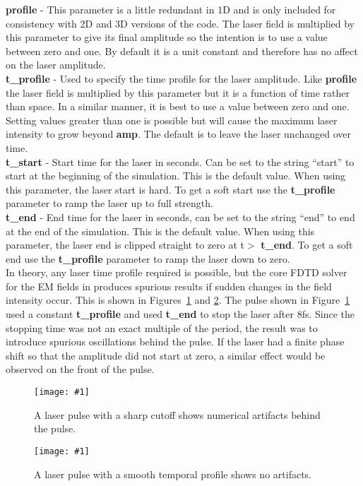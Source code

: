 \documentclass[12pt,a4paper]{article}
\newcommand{\emphtext}{\color{warwickdark} \fontfamily{phv}\selectfont\large\bf}
\newcommand{\inlineemph}[1]{{\color{warwicklight} \bf{#1}}}
\newcommand{\EPOCH}{{\color{warwickdark}\fontfamily{phv}\selectfont{EPOCH}}}
\newcommand{\captionedimage}[3]
  {{\begin{figure}[hbt!]\centering\texttt{[image: \#1]}\caption{#3}\label{#2}
    \end{figure}}}
\begin{document}
{\emphtext profile} - This parameter is a little redundant in 1D and is
only included for consistency with 2D and 3D versions of the code.
The laser field is multiplied by this parameter to give its final amplitude
so the intention is to use a value between zero and one. By default it is a
unit constant and therefore has no affect on the laser amplitude.\\

{\emphtext t\_profile} - Used to specify the time profile for the laser
amplitude. Like \inlineemph{profile} the laser field is multiplied by
this parameter but it is a function of time rather than space. In a similar
manner, it is best to use a value between zero and one.
Setting values greater than one is possible but will cause the maximum laser
intensity to grow beyond \inlineemph{amp}. The default is to leave the
laser unchanged over time.\\

{\emphtext t\_start} - Start time for the laser in seconds. Can be set to the
string ``start'' to start at the beginning of the simulation. This is the
default value. When using this parameter, the laser start is hard. To get a
soft start use the \inlineemph{t\_profile} parameter to ramp the laser up to
full strength.\\

{\emphtext t\_end} - End time for the laser in seconds, can be set to the
string ``end'' to end at the end of the simulation. This is the default value.
When using this parameter, the laser end is clipped straight to zero at
t$>$\inlineemph{t\_end}. To get a soft end use the \inlineemph{t\_profile}
parameter to ramp the laser down to zero.\\

In theory, any laser time profile required is possible, but the core FDTD
solver for the EM fields in {\EPOCH} produces spurious results if sudden
changes in the field intensity occur. This is shown in Figures~\ref{badpulse}
and \ref{smoothpulse}. The pulse shown in Figure~\ref{badpulse} used a constant
\inlineemph{t\_profile} and used \inlineemph{t\_end} to stop the laser after
8fs. Since the stopping time was not an exact multiple of the period, the
result was to introduce spurious oscillations behind the pulse. If the laser
had a finite phase shift so that the amplitude did not start at zero, a
similar effect would be observed on the front of the pulse.

\captionedimage{./images/pulse2}{badpulse}{A laser pulse with a sharp
  cutoff shows numerical artifacts behind the pulse.}
\captionedimage{./images/pulse1}{smoothpulse}{A laser pulse with a smooth
  temporal profile shows no artifacts.}
\end{document}
